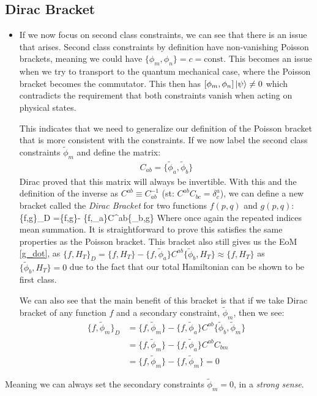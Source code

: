 \documentclass[11pt]{article}
\renewenvironment{flalign}{\vspace{-2mm}\empheq[box=\tcbhighmath]{align}}{\endempheq}
\numberwithin{equation}{section}
\begin{document}
\subsection{Dirac Bracket} %
\label{sub:dirac_bracket}
\begin{itemize}
  \item If we now focus on second class constraints, we can see that there is an issue that arises. Second class constraints by definition have non-vanishing Poisson brackets, meaning we could have $\{\phi_m,\phi_n\} = c = \text{const}$. This becomes an issue when we try to transport to the quantum mechanical case, where the Poisson bracket becomes the commutator. This then has $[\phi_m,\phi_n] \ket{\psi}\neq 0 $ which contradicts the requirement that both constraints vanish when acting on physical states. 


This indicates that we need to generalize our definition of the Poisson bracket that is more consistent with the constraints. If we now label the second class constraints $\tilde{\phi}_m$ and define the matrix:
\begin{align}
\label{constraint matrix}
   C_{ab} = \{\tilde{\phi}_a,\tilde{\phi}_b\}
 \end{align} 
Dirac proved that this matrix will always be invertible. With this and the definition of the inverse as $C^{ab} \equiv C_{ab}^{-1}$ (st: $C^{ab}C_{bc} = \delta^{a}_c$), we can define a new bracket called the \emph{Dirac Bracket} for two functions $f(p,q)$ and $g(p,q)$:
 \begin{flalign}
   \label{D-brac}
   \{f,g\}_{D} =\{f,g\}- \{f,\tilde{\phi}_a\}C^{ab}\{\tilde{\phi}_b,g\}
 \end{flalign}
 Where once again the repeated indices mean summation. It is straightforward to prove this satisfies the same properties as the Poisson bracket. This bracket also still gives us the EoM \ref{g_dot}, as $\{f,H_T\}_{D} =\{f,H_T\}- \{f,\tilde{\phi}_a\}C^{ab}\{\tilde{\phi}_b,H_T\} \approx \{f,H_T\}$ as $\{\tilde{\phi}_b,H_T\} = 0 $ due to the fact that our total Hamiltonian can be shown to be first class. 

 We can also see that the main benefit of this bracket is that if we take Dirac bracket of any function $f$ and a secondary constraint, $\tilde{\phi}_m$, then we see:
 \begin{align}
 \label{Dirac_check}
    \{f,\tilde{\phi}_m\}_{D} &= \{f,\tilde{\phi}_m\}- \{f,\tilde{\phi}_a\}C^{ab}\{\tilde{\phi}_b,\tilde{\phi}_m\} \nonumber\\
    & = \{f,\tilde{\phi}_m\}- \{f,\tilde{\phi}_a\}C^{ab}C_{bm} \nonumber\\
    & = \{f,\tilde{\phi}_m\}- \{f,\tilde{\phi}_m\} = 0 
  \end{align} 
\end{itemize}
Meaning we can always set the secondary constraints $\tilde{\phi}_m=0$, in a \emph{strong sense}. 
\end{document}
